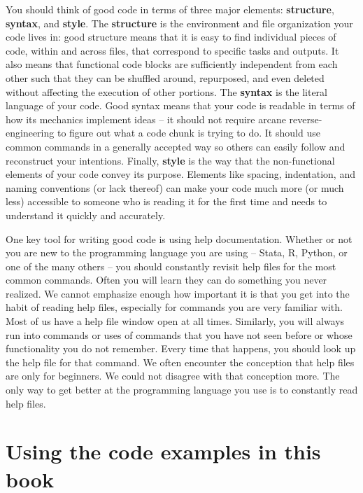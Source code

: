 \documentclass[
]{book}
\begin{document}
You should think of good code in terms of three major elements:
\textbf{structure}, \textbf{syntax}, and \textbf{style}.
The \textbf{structure} is the environment
and file organization your code lives in:
good structure means that it is easy to find individual pieces of code,
within and across files,
that correspond to specific tasks and outputs.
It also means that functional code blocks
are sufficiently independent from each other
such that they can be shuffled around, repurposed,
and even deleted without affecting the execution of other portions.
The \textbf{syntax} is the literal language of your code.
Good syntax means that your code is readable
in terms of how its mechanics implement ideas --
it should not require arcane reverse-engineering
to figure out what a code chunk is trying to do.
It should use common commands in a generally accepted way
so others can easily follow and reconstruct your intentions.
Finally, \textbf{style} is the way
that the non-functional elements of your code convey its purpose.
Elements like spacing, indentation,
and naming conventions (or lack thereof)
can make your code much more
(or much less) accessible to someone
who is reading it for the first time
and needs to understand it quickly and accurately.

One key tool for writing good code is using help documentation.
Whether or not you are new to the programming language you are using
-- Stata, R, Python, or one of the many others --
you should constantly revisit help files for the most common commands.
Often you will learn they can do something you never realized.
We cannot emphasize enough how important it is
that you get into the habit of reading help files,
especially for commands you are very familiar with.
Most of us have a help file window open at all times.
Similarly, you will always run into commands or uses of commands that
you have not seen before or whose functionality you do not remember.
Every time that happens,
you should look up the help file for that command.
We often encounter the conception that help files are only for beginners.
We could not disagree with that conception more.
The only way to get better at the programming language you use
is to constantly read help files.

\hypertarget{using-the-code-examples-in-this-book}{%
\section*{Using the code examples in this book}\label{using-the-code-examples-in-this-book}}
\end{document}
